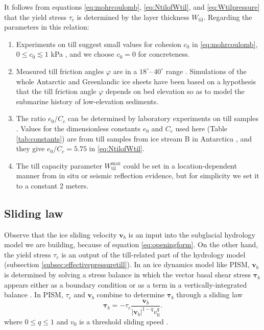 \documentclass[gmd]{copernicus}   %
\newcommand{\text}{\textrm}
\newcommand{\Wtil}{W_{\text{til}}}
\newcommand{\Wtilmax}{W_{\text{til}}^{\text{max}}}
\begin{document}
It follows from equations \eqref{eq:mohrcoulomb}, \eqref{eq:NtilofWtil}, and \eqref{eq:Wtilpressure} that the yield stress $\tau_c$ is determined by the layer thickness $\Wtil$.  Regarding the parameters in this relation:
\renewcommand{\labelenumi}{(\emph{\roman{enumi}})}
\begin{enumerate}
\item Experiments on till suggest small values for cohesion $c_0$ in \eqref{eq:mohrcoulomb}, $0 \le c_0 \lesssim 1$ kPa \citep{Tulaczyketal2000}, and we choose $c_0=0$ for concreteness.
\item Measured till friction angles $\varphi$ are in a $18^\circ$--\,$40^\circ$ range \citep{CuffeyPaterson}.  Simulations of the whole Antarctic \citep{Martinetal2011} and Greenlandic \citep{AschwandenAdalgeirsdottirKhroulev} ice sheets have been based on a hypothesis that the till friction angle $\varphi$ depends on bed elevation so as to model the submarine history of low-elevation sediments.
\item The ratio $e_0/C_c$ can be determined by laboratory experiments on till samples \citep[e.g.][]{Hookeetal1997,Tulaczyketal2000}.  Values for the dimensionless constants $e_0$ and $C_c$ used here (Table \ref{tab:constants}) are from till samples from ice stream B in Antarctica \citep{Tulaczyketal2000}, and they give $e_0/C_c=5.75$ in \eqref{eq:NtilofWtil}.
\item The till capacity parameter $\Wtilmax$ could be set in a location-dependent manner from in situ \citep{Tulaczyketal2000} or seismic reflection \citep{Rooneyetal1987} evidence, but for simplicity we set it to a constant $2$ meters.
\end{enumerate}

\subsection{Sliding law}  Observe that the ice sliding velocity $\mathbf{v}_b$ is an input into the subglacial hydrology model we are building, because of equation \eqref{eq:openingform}.  On the other hand, the yield stress $\tau_c$ is an output of the till-related part of the hydrology model (subsection \ref{subsec:effectivepressuretill}).  In an ice dynamics model like PISM, $\mathbf{v}_b$ is determined by solving a stress balance in which the vector basal shear stress $\boldsymbol\tau_b$ appears either as a boundary condition \citep{SchoofCoulombBlatter} or as a term in a vertically-integrated balance \citep{SchoofStream,BBssasliding}.  In PISM, $\tau_c$ and $\mathbf{v}_b$ combine to determine $\boldsymbol\tau_b$ through a sliding law
\begin{equation}
\boldsymbol\tau_b = - \tau_c \frac{\mathbf{v}_b}{|\mathbf{v}_b|^{1-q} v_0^q}. \label{eq:pseudobasalstress}
\end{equation}
where $0\le q \le 1$ and $v_0$ is a threshold sliding speed \citep{AschwandenAdalgeirsdottirKhroulev}.
\end{document}
